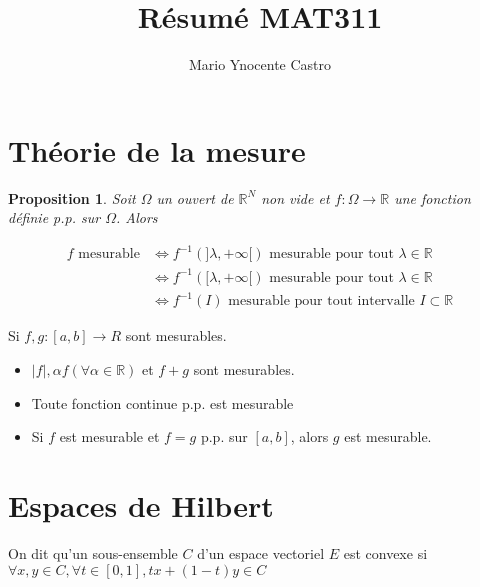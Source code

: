 \documentclass[10pt,a4paper,oneside]{article}
\newtheorem{proposition}{Proposition}
\newenvironment{definition}[1][Definition]{\begin{trivlist}
\item[\hskip \labelsep {\bfseries #1}]}{\end{trivlist}}
\begin{document}
\title{Résumé MAT311}
\author{Mario Ynocente Castro}

\maketitle

\section{Théorie de la mesure}

\begin{proposition}
Soit $\Omega$ un ouvert de $\mathbb{R}^N$ non vide et $f : \Omega \to \mathbb{R}$ une fonction définie p.p. sur $\Omega$. Alors

\begin{align*}
f\text{ mesurable} &\Leftrightarrow f^{-1}(]\lambda,+\infty[) \text{ mesurable pour tout } \lambda \in \mathbb{R}\\
&\Leftrightarrow f^{-1}([\lambda,+\infty[) \text{ mesurable pour tout } \lambda \in \mathbb{R}\\
&\Leftrightarrow f^{-1}(I) \text{ mesurable pour tout intervalle } I \subset \mathbb{R}
\end{align*}

\end{proposition}

Si $f,g : [a,b] \to R$ sont mesurables.

\begin{itemize}
\item
 $|f|, \alpha f(\forall \alpha \in \mathbb{R})$ et $f + g$ sont mesurables.
\item
Toute fonction continue p.p. est mesurable
\item
Si $f$ est mesurable et $f = g$ p.p. sur $[a,b]$, alors $g$ est mesurable.
\end{itemize}

\section{Espaces de Hilbert}

\begin{definition}
On dit qu'un sous-ensemble $C$ d'un espace vectoriel $E$ est convexe si
$\forall x,y \in C, \forall t \in [0,1], tx + (1 - t)y \in C$
\end{definition}
\end{document}

